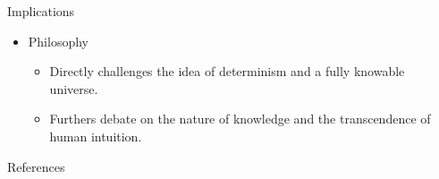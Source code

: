 \documentclass[final]{beamer}
\newlength{\sepwidth}
\newlength{\colwidth}
\newcommand{\separatorcolumn}{\begin{column}{\sepwidth}\end{column}}
\begin{document}
\begin{frame}[t]
\begin{columns}[t]
\begin{column}{\colwidth}
\begin{block}{Implications}
\begin{itemize}
\begin{itemize}
            \item Popularized the arithmetization of syntax in the years leading up to the first computers.
            \item Inspired Turing, and by consequence the field of computability theory.
            \item Furthered the complexity of the discussions on the limitations of computers and artificial intelligence.
            
        \end{itemize}
      
      \item Philosophy
        \begin{itemize}
            \item Directly challenges the idea of determinism and a fully knowable universe.
            \item Furthers debate on the nature of knowledge and the transcendence of human intuition.
        \end{itemize}
        
    \end{itemize}
    
\end{block}

  \begin{block}{References}
    \nocite{*}
    \footnotesize{}

  \end{block}

\end{column}

\separatorcolumn
\end{columns}
\end{frame}
\end{document}
